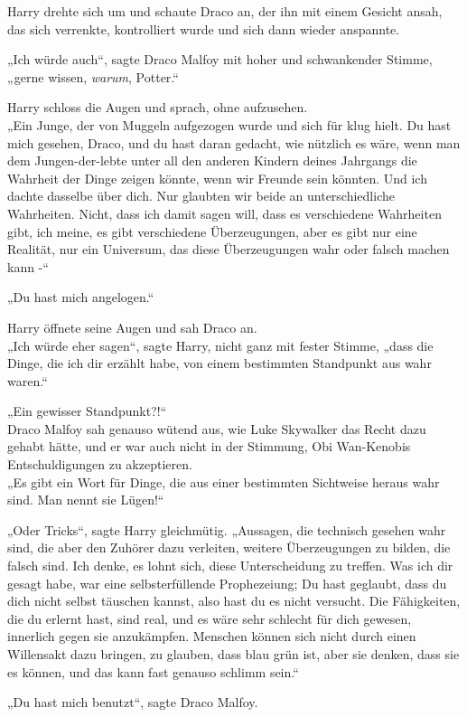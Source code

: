 {Harry drehte sich um und schaute Draco an, der ihn mit einem Gesicht ansah, das sich verrenkte, kontrolliert wurde und sich dann wieder anspannte.

„Ich würde auch“, sagte Draco Malfoy mit hoher und schwankender Stimme, „gerne wissen, \emph{warum}, Potter.“

Harry schloss die Augen und sprach, ohne aufzusehen.\\ „Ein Junge, der von Muggeln aufgezogen wurde und sich für klug hielt. Du hast mich gesehen, Draco, und du hast daran gedacht, wie nützlich es wäre, wenn man dem Jungen-der-lebte unter all den anderen Kindern deines Jahrgangs die Wahrheit der Dinge zeigen könnte, wenn wir Freunde sein könnten. Und ich dachte dasselbe über dich. Nur glaubten wir beide an unterschiedliche Wahrheiten. Nicht, dass ich damit sagen will, dass es verschiedene Wahrheiten gibt, ich meine, es gibt verschiedene Überzeugungen, aber es gibt nur eine Realität, nur ein Universum, das diese Überzeugungen wahr oder falsch machen kann -“

„Du hast mich angelogen.“

Harry öffnete seine Augen und sah Draco an.\\ „Ich würde eher sagen“, sagte Harry, nicht ganz mit fester Stimme, „dass die Dinge, die ich dir erzählt habe, von einem bestimmten Standpunkt aus wahr waren.“

„Ein gewisser Standpunkt?!“\\ Draco Malfoy sah genauso wütend aus, wie Luke Skywalker das Recht dazu gehabt hätte, und er war auch nicht in der Stimmung, Obi Wan-Kenobis Entschuldigungen zu akzeptieren.\\ „Es gibt ein Wort für Dinge, die aus einer bestimmten Sichtweise heraus wahr sind. Man nennt sie Lügen!“

„Oder Tricks“, sagte Harry gleichmütig. „Aussagen, die technisch gesehen wahr sind, die aber den Zuhörer dazu verleiten, weitere Überzeugungen zu bilden, die falsch sind. Ich denke, es lohnt sich, diese Unterscheidung zu treffen. Was ich dir gesagt habe, war eine selbsterfüllende Prophezeiung; Du hast geglaubt, dass du dich nicht selbst täuschen kannst, also hast du es nicht versucht. Die Fähigkeiten, die du erlernt hast, sind real, und es wäre sehr schlecht für dich gewesen, innerlich gegen sie anzukämpfen. Menschen können sich nicht durch einen Willensakt dazu bringen, zu glauben, dass blau grün ist, aber sie denken, dass sie es können, und das kann fast genauso schlimm sein.“

„Du hast mich benutzt“, sagte Draco Malfoy.

}
